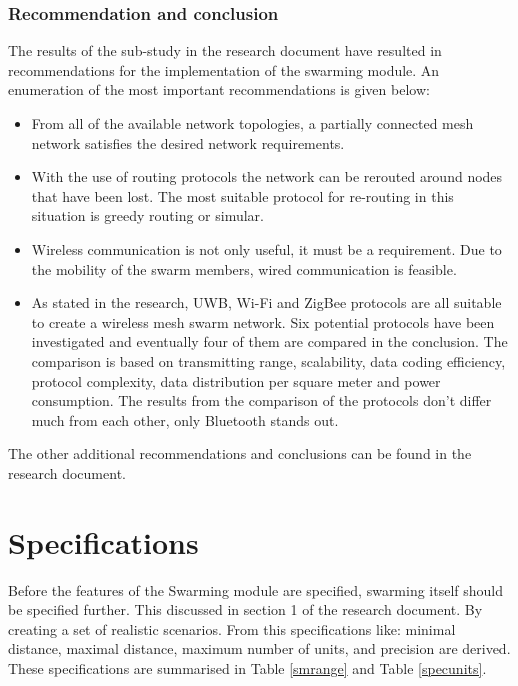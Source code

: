 \documentclass[10pt,a4paper]{article}
\begin{document}
\subsubsection{Recommendation and conclusion}
The results of the sub-study in the research document have resulted in recommendations for the implementation of the
swarming module. An enumeration of the most important recommendations is given below:
\begin{itemize}
\setlength\itemsep{0em}
    \item From all of the available network topologies, a partially connected mesh network satisfies the desired network requirements.
    \item With the use of routing protocols the network can be rerouted around nodes that have been lost. The most suitable protocol for re-routing in this situation is greedy routing or simular.
    \item Wireless communication is not only useful, it must be a requirement. Due to the mobility of the swarm members, wired communication is feasible.
    \item As stated in the research, UWB, Wi-Fi and ZigBee protocols are all suitable to create a wireless mesh swarm network. Six potential protocols have been investigated and eventually four of them are compared in the conclusion. The comparison is based on transmitting range, scalability, data coding efficiency, protocol complexity, data distribution per square meter and power consumption. The results from the comparison of the protocols don't differ much from each other, only Bluetooth stands out.
\end{itemize}
The other additional recommendations and conclusions can be found in the research document.




\section{Specifications}
Before the features of the Swarming module are specified, swarming itself should be specified further. This discussed in section 1 of the research document. By creating a set of realistic scenarios. From this specifications like: minimal distance, maximal distance, maximum number of units, and precision are derived. These specifications are summarised in Table \ref{smrange} and Table \ref{specunits}. 
\end{document}
